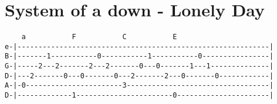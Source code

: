 \section{System of a down - Lonely Day}
\begin{verbatim}
    a           F           C           E
e-|------------------------------------------------------------|
B-|-------1-----------0-----------1-----------0----------------|
G-|-----2---2-------2---2-------0---0-------1---1--------------|
D-|---2-------0---0-------0---2-------2---0-------0------------|
A-|-0-----------------------3----------------------------------|
D-|-------------1-----------------------0----------------------|
\end{verbatim}
\newpage



